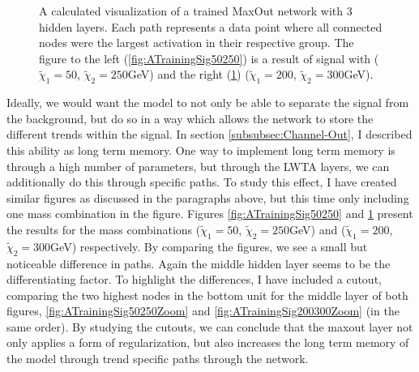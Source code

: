 \begin{figure}
{\begin{subfigure}{.6\textwidth}
        \caption{}
        \label{fig:ATrainingSig200300}
    \end{subfigure}
    }
    \caption{A calculated visualization of a trained MaxOut network with 3 hidden layers. Each path 
    represents a data point where all connected nodes were the largest activation in their respective 
    group. The figure to the left (\ref{fig:ATrainingSig50250}) is a result of signal with 
    ($\tilde{\chi}_1=50$, $\tilde{\chi}_2=250$GeV) and the right (\ref{fig:ATrainingSig200300}) 
    ($\tilde{\chi}_1=200$, $\tilde{\chi}_2=300$GeV).}
    \label{fig:NetVisSigComp}
\end{figure}
Ideally, we would want the model to not only be able to separate the signal from the background, but do so in 
a way which allows the network to store the different trends within the signal. In section \ref{subsubsec:Channel-Out},
I described this ability as long term memory. One way to implement long term memory is through a high number of parameters,
but through the \ac{LWTA} layers, we can additionally do this through specific paths. To study this effect, I have created similar 
figures as discussed in the paragraphs above, but this time only including one mass combination in the figure. Figures
\ref{fig:ATrainingSig50250} and \ref{fig:ATrainingSig200300} present the results for the mass combinations 
($\tilde{\chi}_1=50$, $\tilde{\chi}_2=250$GeV) and ($\tilde{\chi}_1=200$, $\tilde{\chi}_2=300$GeV) respectively.
By comparing the figures, we see a small but noticeable difference in paths. Again the middle hidden layer seems to be 
the differentiating factor. To highlight the differences, I have included a cutout, comparing the two highest nodes in the bottom unit 
for the middle layer of both figures, \ref{fig:ATrainingSig50250Zoom} and \ref{fig:ATrainingSig200300Zoom} (in the same order).
By studying the cutouts, we can conclude that the maxout layer not only applies a form of regularization, but also increases the long term 
memory of the model through trend specific paths through the network.
